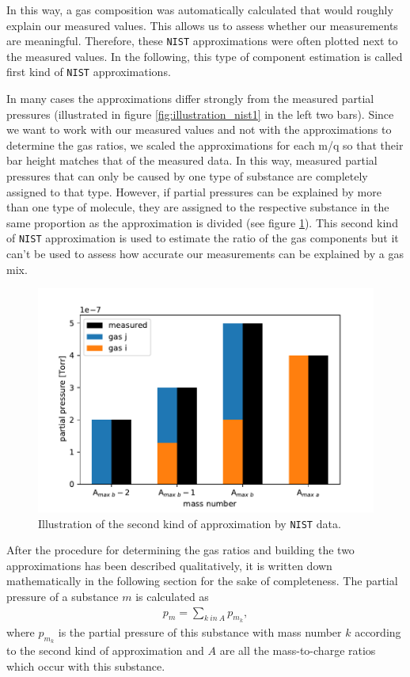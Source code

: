 In this way, a gas composition was automatically calculated that would roughly explain our measured values. This allows us to assess whether our measurements are meaningful. Therefore, these \texttt{NIST} approximations were often plotted next to the measured values. In the following, this type of component estimation is called first kind of \texttt{NIST} approximations. 

In many cases the approximations differ strongly from the measured partial pressures (illustrated in figure \ref{fig:illustration_nist1} in the left two bars). Since we want to work with our measured values and not with the approximations to determine the gas ratios, we scaled the approximations for each m/q so that their bar height matches that of the measured data. In this way, measured partial pressures that can only be caused by one type of substance are completely assigned to that type. However, if partial pressures can be explained by more than one type of molecule, they are assigned to the respective substance in the same proportion as the approximation is divided (see figure \ref{fig:illustration_nist2}). This second kind of \texttt{NIST} approximation is used to estimate the ratio of the gas components but it can't be used to assess how accurate our measurements can be explained by a gas mix. 

\begin{figure}[h!]
    \centering
    \includegraphics[width=\textwidth]{Report/DataResultsPlots/ilustration_nist_approx2.pdf}
    \caption{Illustration of the second kind of approximation by \texttt{NIST} data. }
    \label{fig:illustration_nist2}
\end{figure}

After the procedure for determining the gas ratios and building the two approximations has been described qualitatively, it is written down mathematically in the following section for the sake of completeness. 
The partial pressure of a substance $m$ is calculated as
\begin{align}
   p_m = \sum_{k~in~A} {p_{m_k}}, 
\end{align}
where $p_{m_k}$ is the partial pressure of this substance with mass number $k$ according to the second kind of approximation and $A$ are all the mass-to-charge ratios which occur with this substance. 


